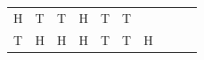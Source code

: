 {{\begin{center}
\begin{tabular}[t]{|l|l|l|l|l|l|l|l|l|l|}
        H &
        T &
        T &
        H &
        T &
        T%
     \tabularnewline\cline{1-1}\cline{2-2}\cline{3-3}\cline{4-4}\cline{5-5}\cline{6-6}\cline{7-7}\cline{8-8}\cline{9-9}\cline{10-10}
        T &
        H &
        H &
        H &
        T &
        T &
        H &

\end{tabular}
\end{center}}}
